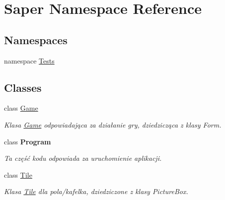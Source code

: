 \hypertarget{namespace_saper}{}\section{Saper Namespace Reference}
\label{namespace_saper}
\subsection*{Namespaces}
\begin{DoxyCompactItemize}
\item 
namespace \mbox{\hyperlink{namespace_saper_1_1_tests}{Tests}}
\end{DoxyCompactItemize}
\subsection*{Classes}
\begin{DoxyCompactItemize}
\item 
class \mbox{\hyperlink{class_saper_1_1_game}{Game}}
\begin{DoxyCompactList}\small\item\em Klasa \mbox{\hyperlink{class_saper_1_1_game}{Game}} odpowiadająca za działanie gry, dziedzicząca z klasy Form. \end{DoxyCompactList}\item 
class {\bfseries Program}
\begin{DoxyCompactList}\small\item\em Ta część kodu odpowiada za uruchomienie aplikacji. \end{DoxyCompactList}\item 
class \mbox{\hyperlink{class_saper_1_1_tile}{Tile}}
\begin{DoxyCompactList}\small\item\em Klasa \mbox{\hyperlink{class_saper_1_1_tile}{Tile}} dla pola/kafelka, dziedziczone z klasy Picture\+Box. \end{DoxyCompactList}\end{DoxyCompactItemize}

